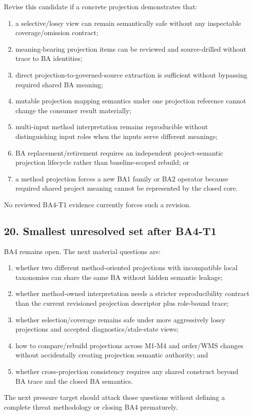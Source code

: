 \documentclass[11pt,a4paper]{article}
\providecommand{\tightlist}{\setlength{\itemsep}{0pt}\setlength{\parskip}{0pt}}
\begin{document}
Revise this candidate if a concrete projection demonstrates that:

\begin{enumerate}
\def\labelenumi{\arabic{enumi}.}
\tightlist
\item
  a selective/lossy view can remain semantically safe without any inspectable coverage/omission contract;
\item
  meaning-bearing projection items can be reviewed and source-drilled without trace to BA identities;
\item
  direct projection-to-governed-source extraction is sufficient without bypassing required shared BA meaning;
\item
  mutable projection mapping semantics under one projection reference cannot change the consumer result materially;
\item
  multi-input method interpretation remains reproducible without distinguishing input roles when the inputs serve different meanings;
\item
  BA replacement/retirement requires an independent project-semantic projection lifecycle rather than baseline-scoped rebuild; or
\item
  a method projection forces a new BA1 family or BA2 operator because required shared project meaning cannot be represented by the closed core.
\end{enumerate}

No reviewed BA4-T1 evidence currently forces such a revision.

\subsection{20. Smallest unresolved set after BA4-T1}\label{20-smallest-unresolved-set-after-ba4-t1}

BA4 remains open. The next material questions are:

\begin{enumerate}
\def\labelenumi{\arabic{enumi}.}
\tightlist
\item
  whether two different method-oriented projections with incompatible local taxonomies can share the same BA without hidden semantic leakage;
\item
  whether method-owned interpretation needs a stricter reproducibility contract than the current revisioned projection descriptor plus role-bound trace;
\item
  whether selection/coverage remains safe under more aggressively lossy projections and accepted diagnostics/stale-state views;
\item
  how to compare/rebuild projections across M1-M4 and order/WMS changes without accidentally creating projection semantic authority; and
\item
  whether cross-projection consistency requires any shared construct beyond BA trace and the closed BA semantics.
\end{enumerate}

The next pressure target should attack those questions without defining a complete threat methodology or closing BA4 prematurely.
\end{document}

